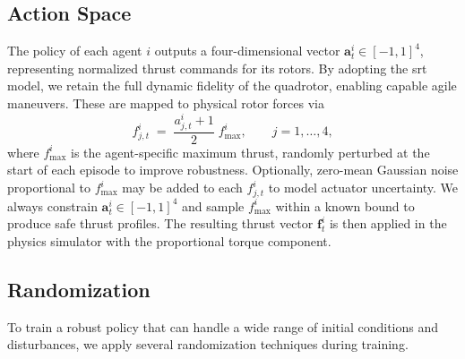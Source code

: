 \subsection{Action Space}
The policy of each agent \(i\) outputs a four-dimensional vector \(\mathbf{a}^i_t\in[-1,1]^4\), representing normalized thrust commands for its rotors. By adopting the \gls{srt} model, we retain the full dynamic fidelity of the quadrotor, enabling capable agile maneuvers.
 These are mapped to physical rotor forces via
\begin{equation}
f^i_{j,t}
\;=\;
\frac{a^i_{j,t} + 1}{2}\;f_{\max}^i,
\qquad
j=1,\dots,4,
\end{equation}
where \(f_{\max}^i\) is the agent-specific maximum thrust, randomly perturbed at the start of each episode to improve robustness.  Optionally, zero-mean Gaussian noise proportional to \(f_{\max}^i\) may be added to each \(f^i_{j,t}\) to model actuator uncertainty. We always constrain \(\mathbf{a}^i_t\in[-1,1]^4\) and sample \(f_{\max}^i\) within a known bound to produce safe thrust profiles. The resulting thrust vector \(\mathbf{f}^i_t\) is then applied in the physics simulator with the proportional torque component.
\subsection{Randomization}
To train a robust policy that can handle a wide range of initial conditions and disturbances, we apply several randomization techniques during training.
